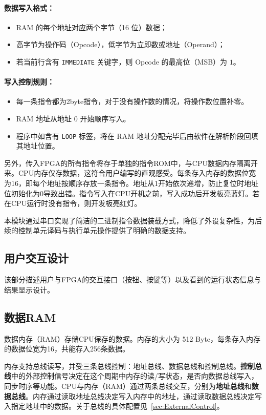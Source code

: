 \documentclass[lang=cn,a4paper,newtx]{elegantpaper}
\begin{document}
\paragraph{数据写入格式：}

\begin{itemize}
  \item RAM 的每个地址对应两个字节（16 位）数据；
  \item 高字节为操作码（Opcode），低字节为立即数或地址（Operand）；
  \item 若当前行含有 \texttt{IMMEDIATE} 关键字，则 Opcode 的最高位（MSB）为 $1$。
\end{itemize}

\paragraph{写入控制规则：}

\begin{itemize}
  \item 每一条指令都为2byte指令，对于没有操作数的情况，将操作数位置补零。
  \item RAM 地址从地址 0 开始顺序写入。
  \item 程序中如含有 \texttt{LOOP} 标签，将在 RAM 地址分配完毕后由软件在解析阶段回填其地址位置。
\end{itemize}

另外，传入FPGA的所有指令将存于单独的指令ROM中，与CPU数据内存隔离开来。CPU内存仅存数据，这符合用户编写的直观感受。每条存入内存的数据位宽为16，即每个地址按顺序存放一条指令。地址从1开始依次递增，防止复位时地址位初始化为0导致出错。指令写入在CPU开机之前，写入成功后开发板亮蓝灯。若在CPU运行时没有指令，则开发板亮红灯。

本模块通过串口实现了简洁的二进制指令数据装载方式，降低了外设复杂性，为后续的控制单元译码与执行单元操作提供了明确的数据支持。

\subsection{用户交互设计}\label{sec:interaction}
该部分描述用户与FPGA的交互接口（按钮、按键等）以及看到的运行状态信息与结果显示设计。
\subsection{数据RAM}
数据内存（RAM）存储CPU保存的数据。内存的大小为 512 Byte，每条存入内存的数据位宽为16，共能存入256条数据。

内存支持总线读写，并受三条总线控制：地址总线、数据总线和控制总线。\textbf{控制总线}中的外部控制信号决定在这个周期中内存的读/写状态，是否向数据总线写入，同步时序等功能。CPU与内存（RAM）通过两条总线交互，分别为\textbf{地址总线}和\textbf{数据总线}。内存通过读取地址总线决定写入内存中的地址，通过读取数据总线决定写入指定地址中的数据。关于总线的具体配置见~\ref{sec:ExternalControl}。
\end{document}
